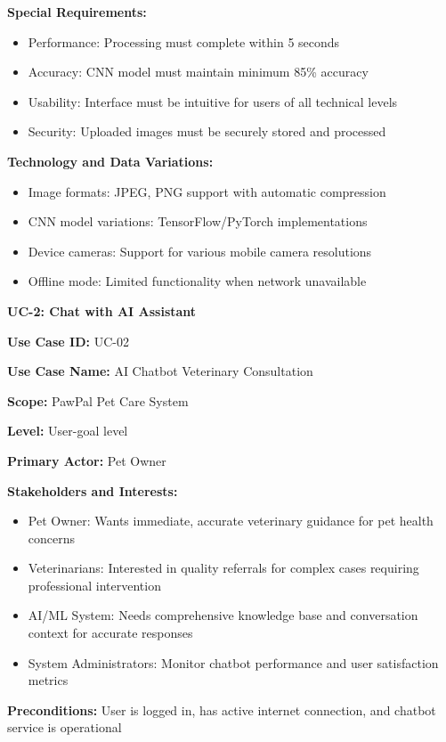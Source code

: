\textbf{Special Requirements:}
\begin{itemize}
    \item Performance: Processing must complete within 5 seconds
    \item Accuracy: CNN model must maintain minimum 85\% accuracy
    \item Usability: Interface must be intuitive for users of all technical levels
    \item Security: Uploaded images must be securely stored and processed
\end{itemize}

\textbf{Technology and Data Variations:}
\begin{itemize}
    \item Image formats: JPEG, PNG support with automatic compression
    \item CNN model variations: TensorFlow/PyTorch implementations
    \item Device cameras: Support for various mobile camera resolutions
    \item Offline mode: Limited functionality when network unavailable
\end{itemize}

\textbf{UC-2: Chat with AI Assistant}

\textbf{Use Case ID:} UC-02

\textbf{Use Case Name:} AI Chatbot Veterinary Consultation

\textbf{Scope:} PawPal Pet Care System

\textbf{Level:} User-goal level

\textbf{Primary Actor:} Pet Owner

\textbf{Stakeholders and Interests:}
\begin{itemize}
    \item Pet Owner: Wants immediate, accurate veterinary guidance for pet health concerns
    \item Veterinarians: Interested in quality referrals for complex cases requiring professional intervention
    \item AI/ML System: Needs comprehensive knowledge base and conversation context for accurate responses
    \item System Administrators: Monitor chatbot performance and user satisfaction metrics
\end{itemize}

\textbf{Preconditions:} User is logged in, has active internet connection, and chatbot service is operational

